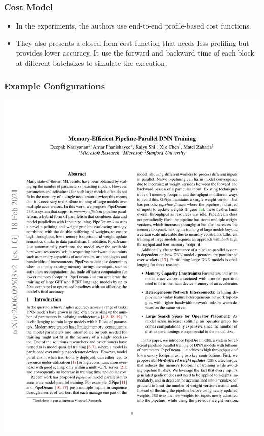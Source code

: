 \documentclass[12pt,aspectratio=169]{beamer}
\begin{document}
    \begin{frame}
        \frametitle{Cost Model}

        \begin{itemize}
            \setlength{\itemsep}{.8em}
            \item In the experiments, the authors use end-to-end profile-based cost functions.
            \item They also presents a closed form cost function that needs less profiling but provides lower accuracy.
            It use the forward and backward time of each block at different batchsizes to simulate the execution.
        \end{itemize}
    \end{frame}

    \begin{frame}
        \frametitle{Example Configurations}

        \begin{center}
            \includegraphics[page=7,trim=2cm 20.8cm 11cm 1.9cm,clip,scale=1.1]{pipedream-2bw.pdf}
        \end{center}
    \end{frame}
\end{document}
